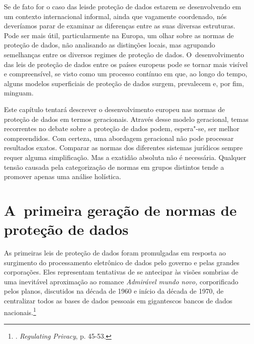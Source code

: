 Se de fato for o caso das leisde proteção de dados estarem se
desenvolvendo em um contexto internacional informal, ainda que vagamente
coordenado, nós deveríamos parar de examinar as diferenças entre as suas
diversas estruturas. Pode ser mais útil, particularmente na Europa, um
olhar sobre as normas de proteção de dados, não analisando as distinções
locais, mas agrupando semelhanças entre os diversos regimes de proteção
de dados. O~desenvolvimento das leis de proteção de dados entre os
países europeus pode se tornar mais visível e compreensível, se visto
como um processo contínuo em que, ao longo do tempo, alguns modelos
superficiais de proteção de dados surgem, prevalecem e, por fim,
minguam.

Este capítulo tentará descrever o desenvolvimento europeu nas normas de
proteção de dados em termos geracionais. Através desse modelo
geracional, temas recorrentes no debate sobre a proteção de dados podem,
espera"-se, ser melhor compreendidos. Com certeza, uma abordagem
geracional não pode processar resultados exatos. Comparar as normas dos
diferentes sistemas jurídicos sempre requer alguma simplificação. Mas a
exatidão absoluta não é necessária. Qualquer tensão causada pela
categorização de normas em grupos distintos tende a promover apenas uma
análise holística.

\section{A~primeira geração de normas de proteção de dados}

As primeiras leis de proteção de dados foram promulgadas em resposta ao
surgimento do processamento eletrônico de dados pelo governo e pelas
grandes corporações. Eles representam tentativas de se antecipar às
visões sombrias de uma inevitável aproximação ao romance \emph{Admirável
mundo novo,} corporificado pelos planos, discutidos na década de 1960 e
início da década de 1970, de centralizar todos as bases de dados
pessoais em gigantescos bancos de dados nacionais.\footnote{.
  \emph{Regulating Privacy}, p. 45-53.}

